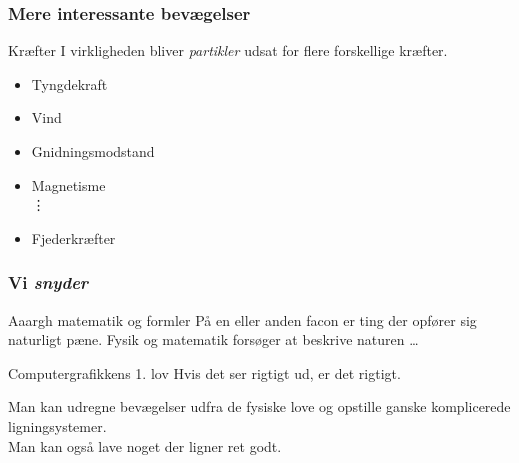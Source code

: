 \documentclass{beamer}
\begin{document}
\begin{frame}
  \frametitle{Mere interessante bevægelser}

  \begin{block}{Kræfter}
    I virkligheden bliver \emph{partikler} udsat for flere forskellige kræfter.
    \begin{itemize}
    \item Tyngdekraft
    \item Vind
    \item Gnidningsmodstand
    \item Magnetisme\\
      \hspace{.3cm}       \vdots
    \item Fjederkræfter

    \end{itemize}
  \end{block}

\end{frame}


\begin{frame}
  \frametitle{Vi \emph{snyder}}


  \begin{block}{Aaargh matematik og formler}
    På en eller anden facon er ting der opfører sig naturligt pæne. Fysik og matematik forsøger at beskrive naturen \ldots
  \end{block}


  \begin{block}{Computergrafikkens 1. lov}
    Hvis det ser rigtigt ud, er det rigtigt.
  \end{block}

  Man kan udregne bevægelser udfra de fysiske love og opstille ganske
  komplicerede ligningsystemer. \\
  Man kan også lave noget der ligner ret godt.

\end{frame}
\end{document}
